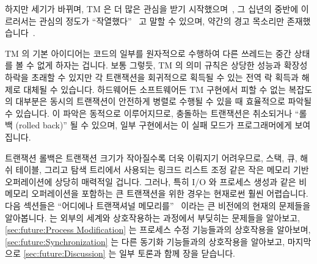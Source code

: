 \fi

하지만 세기가 바뀌며, TM 은 더 많은 관심을 받기
시작했으며~\cite{Martinez01a,Rajwar01a}, 그 십년의 중반에 이르러서는 관심의
정도가 ``작열했다''~\cite{MauriceHerlihy2005-TM-manifesto.pldi,
DanGrossman2007TMGCAnalogy} 고 말할 수 있으며, 약간의 경고 목소리만
존재했습니다~\cite{Blundell2005DebunkTM,McKenney2007PLOSTM}.

TM 의 기본 아이디어는 코드의 일부를 원자적으로 수행하여 다른 쓰레드는 중간
상태를 볼 수 없게 하자는 겁니다.
보통 그렇듯, TM 의 의미 규칙은 상당한 성능과 확장성 하락을 초래할 수 있지만 각
트랜잭션을 회귀적으로 획득될 수 있는 전역 락 획득과 해제로 대체될 수 있습니다.
하드웨어든 소프트웨어든 TM 구현에서 피할 수 없는 복잡도의 대부분은 동시의
트랜잭션이 안전하게 병렬로 수행될 수 있을 때 효율적으로 파악될 수 있습니다.
이 파악은 동적으로 이루어지므로, 충돌하는 트랜잭션은 취소되거나 ``롤백 (rolled
back)'' 될 수 있으며, 일부 구현에서는 이 실패 모드가 프로그래머에게 보여집니다.

트랜잭션 롤백은 트랜잭션 크기가 작아질수록 더욱 이뤄지기 어려우므로, 스택, 큐,
해쉬 테이블, 그리고 탐색 트리에서 사용되는 링크드 리스트 조정 같은 작은 메모리
기반 오퍼레이션에 상당히 매력적일 겁니다.
그러나, 특히 I/O 와 프로세스 생성과 같은 비 메모리 오퍼레이션을 포함하는 큰
트랜잭션을 위한 경우는 현재로썬 훨씬 어렵습니다.
다음 섹션들은 ``어디에나 트랜잭셔널
메모리를''~\cite{PaulEMcKenney2009TMeverywhere} 이라는 큰 비전에의 현재의
문제들을 알아봅니다.
 는 외부의 세계와 상호작용하는 과정에서 부딪히는
문제들을 알아보고,
\cref{sec:future:Process Modification} 는 프로세스 수정 기능들과의 상호작용을
알아보며,
\cref{sec:future:Synchronization} 는 다른 동기화 기능들과의 상호작용을
알아보고, 마지막으로
\cref{sec:future:Discussion} 는 일부 토론과 함께 장을 닫습니다.

